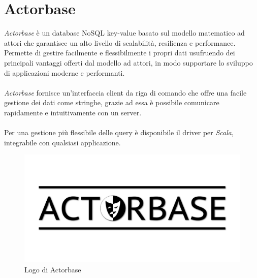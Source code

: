 \documentclass[a4paper]{article}
\begin{document}
	\section{Actorbase}
	\emph{Actorbase} è un database NoSQL key-value basato sul modello matematico ad attori che garantisce un alto livello di scalabilità, resilienza e performance. Permette di gestire facilmente e flessibilmente i propri dati usufruendo dei principali vantaggi offerti dal modello ad attori, in modo supportare lo sviluppo di applicazioni moderne e performanti. 
	\\ \\
	\emph{Actorbase} fornisce un'interfaccia client da riga di comando che offre una facile gestione dei dati come stringhe, grazie ad essa è possibile comunicare rapidamente e intuitivamente con un server. 
	\\ \\
	Per una gestione più flessibile delle query è disponibile il driver per \emph{Scala}, integrabile con qualsiasi applicazione.
	\begin{figure}[H]
		\centering
		\includegraphics[scale=0.4]{actorbaseLogo.png}
		\caption{Logo di Actorbase}
	\end{figure}

	\newpage
\end{document}
